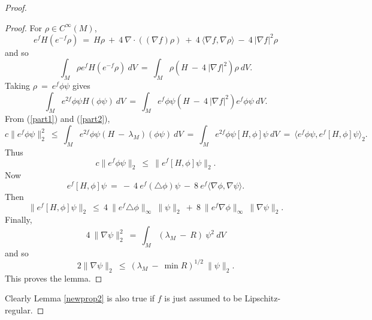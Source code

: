 \begin{proof}
\begin{proof}
For $\rho \in C^\infty(M)$,
\begin{equation} \label{Hf}
e^f H (e^{-f} \rho) \: = \: H \rho \: + \: 4 \: \nabla \cdot
((\nabla f) \rho) \: + \: 4 \: \langle \nabla f, \nabla \rho \rangle
\: - \: 4 \: |\nabla f|^2 \rho
\end{equation}
and so
\begin{equation}
\int_M \rho e^f H(e^{-f} \rho) \: dV \: = \:
\int_M \rho (H \: - \: 4 \: |\nabla f|^2) \rho \: dV.
\end{equation}
Taking $\rho \: = \: e^f \phi \psi$ gives
\begin{equation} \label{part2}
\int_M e^{2f} \phi \psi H(\phi \psi) \: dV \: = \:
\int_M e^f \phi \psi (H \: - \: 4 \:
|\nabla f|^2)  e^{f} \phi \psi \: dV.
\end{equation}
From (\ref{part1}) and (\ref{part2}),
\begin{equation}
c \|e^f \phi \psi \|_2^2 \: \le \:
\int_M e^{2f} \phi \psi (H \: - \: \lambda_M) (\phi \psi) \: dV \: = \:
\int_M e^{2f} \phi \psi [H, \phi] \psi \: dV \: = \:
\langle e^{f} \phi \psi, e^{f} [H, \phi] \psi \rangle_2.
\end{equation}
Thus
\begin{equation}
c \|e^f \phi \psi \|_2 \: \le \:
\|e^{f} [H, \phi] \psi\|_2.
\end{equation}
Now
\begin{equation}
e^{f} [H, \phi] \psi \: = \: - \: 4 \: e^f (\triangle \phi) \psi \: - \:
8 \: e^f \langle \nabla\phi, \nabla \psi \rangle.
\end{equation}
Then
\begin{equation}
\|e^{f} [H, \phi] \psi\|_2 \: \le \:
4 \: \|e^f \triangle \phi\|_\infty \: \|\psi\|_2 \: + \: 8 \:
\|e^f \nabla\phi\|_\infty \: \|\nabla \psi\|_2.
\end{equation}
Finally,
\begin{equation}
4 \: \|\nabla \psi\|_2^2 \: = \: \int_M (\lambda_M \: - \: R) \: \psi^2 \:
dV
\end{equation}
and so
\begin{equation}
2 \|\nabla \psi\|_2 \: \le \: (\lambda_M \: - \: \min R)^{1/2} \:
\|\psi\|_2.
\end{equation}
This proves the lemma.
\end{proof}

Clearly Lemma \ref{newprop2} is also true if
$f$ is just assumed to be Lipschitz-regular.


\end{proof}

